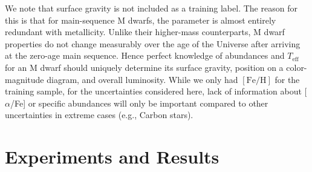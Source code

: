 \documentclass[twocolumn]{aastex62}
\newcommand{\teff}{T_{\mathrm{eff}}}
\newcommand{\feh}{[{\mathrm{Fe}/\mathrm{H}}]}
\begin{document}
We note that surface gravity is not included as a training label. The reason for this is that for main-sequence M dwarfs, the parameter is almost entirely redundant with metallicity. Unlike their higher-mass counterparts, M dwarf properties do not change measurably over the age of the Universe after arriving at the zero-age main sequence. Hence perfect knowledge of abundances and $\teff$ for an M dwarf should uniquely determine its surface gravity, position on a color-magnitude diagram, and overall luminosity. While we only had $\feh$ for the training sample, for the uncertainties considered here, lack of information about [$\alpha$/Fe] or specific abundances will only be important compared to other uncertainties in extreme cases (e.g., Carbon stars).  


\section{Experiments and Results} \label{sec:results}
\end{document}

